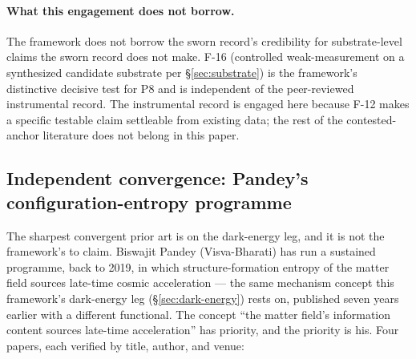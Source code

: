 \documentclass[11pt,a4paper]{article}
\begin{document}
\paragraph{What this engagement does not borrow.} The framework does not borrow the sworn record's credibility for substrate-level claims the sworn record does not make. F-16 (controlled weak-measurement on a synthesized candidate substrate per \S\ref{sec:substrate}) is the framework's distinctive decisive test for P8 and is independent of the peer-reviewed instrumental record. The instrumental record is engaged here because F-12 makes a specific testable claim settleable from existing data; the rest of the contested-anchor literature does not belong in this paper.

\subsection*{Independent convergence: Pandey's configuration-entropy programme}

The sharpest convergent prior art is on the dark-energy leg, and it is not the framework's to claim. Biswajit Pandey (Visva-Bharati) has run a sustained programme, back to 2019, in which structure-formation entropy of the matter field sources late-time cosmic acceleration --- the same mechanism concept this framework's dark-energy leg (\S\ref{sec:dark-energy}) rests on, published seven years earlier with a different functional. The concept ``the matter field's information content sources late-time acceleration'' has priority, and the priority is his. Four papers, each verified by title, author, and venue:
\end{document}
